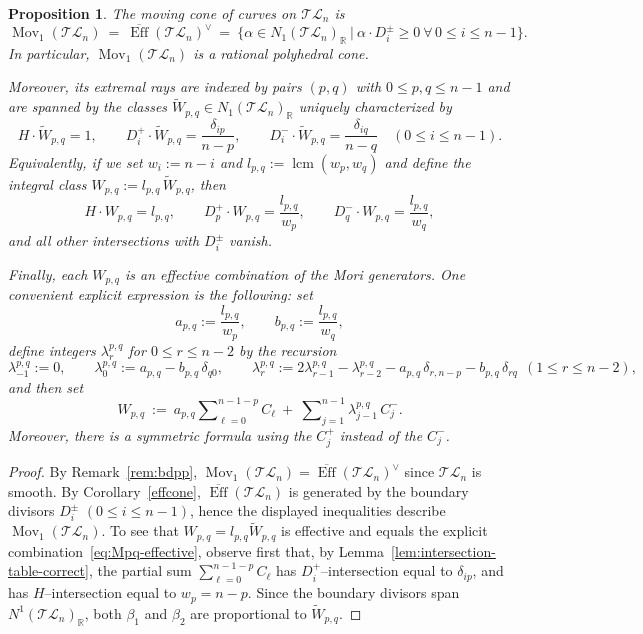 \documentclass[10pt]{amsart}
\newtheorem{proposition}[theorem]{Proposition}
\theoremstyle{definition}
\newcommand{\R}{\mathbb{R}}
\newcommand{\Eff}{\operatorname{Eff}}
\newcommand{\Mov}{\operatorname{Mov}}
\newcommand{\TL}{\mathcal{TL}}
\DeclareMathOperator{\lcm}{lcm}
\theoremstyle{plain} %
\begin{document}
\begin{proposition}\label{prop:movcone-TLn-correct}
The moving cone of curves on $\TL_n$ is
\[
\Mov_1(\TL_n)
\ =\
\overline{\Eff}(\TL_n)^\vee
\ =\
\bigl\{\alpha\in N_1(\TL_n)_\R\ \big|\ \alpha\cdot D_i^\pm\ge 0\ \forall\,0\le i\le n-1\bigr\}.
\]
In particular, $\Mov_1(\TL_n)$ is a rational polyhedral cone.

Moreover, its extremal rays are indexed by pairs $(p,q)$ with $0\le p,q\le n-1$
and are spanned by the classes $\widetilde W_{p,q}\in N_1(\TL_n)_\R$ uniquely characterized by
\[
H\cdot \widetilde W_{p,q}=1,\qquad
D_i^+\cdot \widetilde W_{p,q}=\frac{\delta_{ip}}{n-p},\qquad
D_i^-\cdot \widetilde W_{p,q}=\frac{\delta_{iq}}{n-q}
\quad (0\le i\le n-1).
\]
Equivalently, if we set $w_i:=n-i$ and $l_{p,q}:=\lcm(w_p,w_q)$ and define the
integral class $W_{p,q}:=l_{p,q}\,\widetilde W_{p,q}$, then
\[
H\cdot W_{p,q}=l_{p,q},\qquad
D_p^+\cdot W_{p,q}=\frac{l_{p,q}}{w_p},\qquad
D_q^-\cdot W_{p,q}=\frac{l_{p,q}}{w_q},
\]
and all other intersections with $D_i^\pm$ vanish.

Finally, each $W_{p,q}$ is an effective combination of the Mori generators.
One convenient explicit expression is the following: set
\[
a_{p,q}:=\frac{l_{p,q}}{w_p},\qquad b_{p,q}:=\frac{l_{p,q}}{w_q},
\]
define integers $\lambda^{p,q}_r$ for $0\le r\le n-2$ by the recursion
\begin{equation}\label{eq:lambda-recursion}
\lambda^{p,q}_{-1}:=0,\qquad
\lambda^{p,q}_0:=a_{p,q}-b_{p,q}\,\delta_{q0},
\qquad
\lambda^{p,q}_r:=2\lambda^{p,q}_{r-1}-\lambda^{p,q}_{r-2}
-a_{p,q}\,\delta_{r,n-p}-b_{p,q}\,\delta_{rq}
\ \ (1\le r\le n-2),
\end{equation}
and then set
\begin{equation}\label{eq:Mpq-effective}
W_{p,q}
\ :=\
a_{p,q}\sum\nolimits_{\ell=0}^{n-1-p} C_\ell
\ +\
\sum\nolimits_{j=1}^{n-1}\lambda^{p,q}_{j-1}\,C_j^-.
\end{equation}
Moreover, there is a symmetric formula using the $C_j^+$ instead of the $C_j^-$.
\end{proposition}
\begin{proof}
By Remark~\ref{rem:bdpp}, $\Mov_1(\TL_n)=\overline{\Eff}(\TL_n)^\vee$ since $\TL_n$ is smooth. By Corollary~\ref{effcone}, $\overline{\Eff}(\TL_n)$ is generated by the boundary divisors $D_i^\pm$ $(0\le i\le n-1)$, hence the displayed inequalities describe $\Mov_1(\TL_n)$. To see that $W_{p,q}=l_{p,q}\widetilde W_{p,q}$ is effective and equals the explicit combination~\eqref{eq:Mpq-effective}, observe first that, by Lemma~\ref{lem:intersection-table-correct}, the partial sum $\sum_{\ell=0}^{n-1-p} C_\ell$ has $D_i^+$--intersection equal to $\delta_{ip}$, and has $H$--intersection equal to $w_p=n-p$. Since the boundary divisors span $N^1(\TL_n)_\R$, both $\beta_1$ and $\beta_2$ are proportional to $\widetilde W_{p,q}$.
\end{proof}
\end{document}
